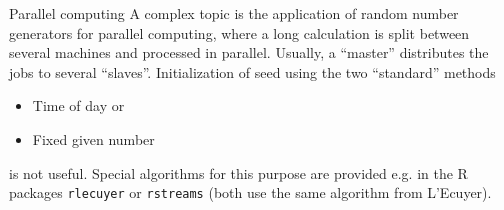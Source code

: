 \begin{vbframe}{Parallel computing}
A complex topic is the application of random number generators for parallel computing, where a long calculation is split between several machines and processed in parallel.
Usually, a \enquote{master} distributes the jobs to several \enquote{slaves}.
Initialization of seed using the two \enquote{standard} methods
\begin{itemize}
  \item Time of day or
  \item Fixed given number
\end{itemize}
is not useful.
Special algorithms for this purpose are provided e.g. in the R packages \texttt{rlecuyer} or
\texttt{rstreams} (both use the same algorithm from L'Ecuyer).
\end{vbframe}



\endlecture


